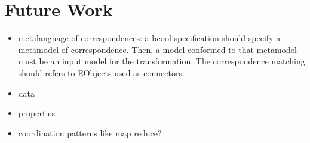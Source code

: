 \begin{itemize}


	
		
	  	
	  	
	

	
\end{itemize}
\section{Future Work}
\begin{itemize}
	\item metalanguage of correspondences: a bcool specification should specify a metamodel of correspondence. Then, a model conformed to that metamodel must be an input model for the transformation. The correspondence matching should refers to EObjects used as connectors. 
	\item data
	\item properties 
	\item coordination patterns like map reduce? 
\end{itemize}

